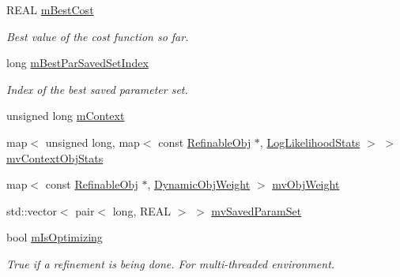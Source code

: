 \begin{DoxyCompactItemize}
\mbox{\label{class_obj_cryst_1_1_optimization_obj_a495926a48dd408a3b92de8a6b33f815a}} 
R\+E\+AL \mbox{\hyperlink{class_obj_cryst_1_1_optimization_obj_a495926a48dd408a3b92de8a6b33f815a}{m\+Best\+Cost}}
\begin{DoxyCompactList}\small\item\em Best value of the cost function so far. \end{DoxyCompactList}\item 
\mbox{\label{class_obj_cryst_1_1_optimization_obj_aa9c2d238f7b60c7ea3bd715bf145b5d3}} 
long \mbox{\hyperlink{class_obj_cryst_1_1_optimization_obj_aa9c2d238f7b60c7ea3bd715bf145b5d3}{m\+Best\+Par\+Saved\+Set\+Index}}
\begin{DoxyCompactList}\small\item\em Index of the \textquotesingle{}best\textquotesingle{} saved parameter set. \end{DoxyCompactList}\item 
unsigned long \mbox{\hyperlink{class_obj_cryst_1_1_optimization_obj_a7139f75c5b214ea00f99c2e4c25b2b34}{m\+Context}}
\item 
map$<$ unsigned long, map$<$ const \mbox{\hyperlink{class_obj_cryst_1_1_refinable_obj}{Refinable\+Obj}} $\ast$, \mbox{\hyperlink{struct_obj_cryst_1_1_optimization_obj_1_1_log_likelihood_stats}{Log\+Likelihood\+Stats}} $>$ $>$ \mbox{\hyperlink{class_obj_cryst_1_1_optimization_obj_a1b33baa71f4e0b182bae66766608425f}{mv\+Context\+Obj\+Stats}}
\item 
map$<$ const \mbox{\hyperlink{class_obj_cryst_1_1_refinable_obj}{Refinable\+Obj}} $\ast$, \mbox{\hyperlink{struct_obj_cryst_1_1_optimization_obj_1_1_dynamic_obj_weight}{Dynamic\+Obj\+Weight}} $>$ \mbox{\hyperlink{class_obj_cryst_1_1_optimization_obj_a4b1120b0a6fc24c82c273152722f672c}{mv\+Obj\+Weight}}
\item 
std\+::vector$<$ pair$<$ long, R\+E\+AL $>$ $>$ \mbox{\hyperlink{class_obj_cryst_1_1_optimization_obj_a9063bb2fa6a6f0938295be2ffe2bfe84}{mv\+Saved\+Param\+Set}}
\item 
\mbox{\label{class_obj_cryst_1_1_optimization_obj_a712048cd592825ce31ced1120733345b}} 
bool \mbox{\hyperlink{class_obj_cryst_1_1_optimization_obj_a712048cd592825ce31ced1120733345b}{m\+Is\+Optimizing}}
\begin{DoxyCompactList}\small\item\em True if a refinement is being done. For multi-\/threaded environment. \end{DoxyCompactList}\item 

\end{DoxyCompactItemize}
